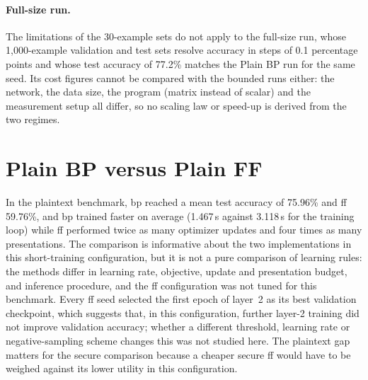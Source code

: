 \paragraph{Full-size run.} The limitations of the 30-example sets do not apply to the full-size run, whose 1{,}000-example validation and test sets resolve accuracy in steps of 0.1 percentage points and whose test accuracy of 77.2\% matches the Plain BP run for the same seed. Its cost figures cannot be compared with the bounded runs either: the network, the data size, the program (matrix instead of scalar) and the measurement setup all differ, so no scaling law or speed-up is derived from the two regimes.

\section{Plain BP versus Plain FF}\label{sec:disc-plain}
In the plaintext benchmark, \ac{bp} reached a mean test accuracy of 75.96\% and \ac{ff} 59.76\%, and \ac{bp} trained faster on average (1.467\,s against 3.118\,s for the training loop) while \ac{ff} performed twice as many optimizer updates and four times as many presentations. The comparison is informative about the two implementations in this short-training configuration, but it is not a pure comparison of learning rules: the methods differ in learning rate, objective, update and presentation budget, and inference procedure, and the \ac{ff} configuration was not tuned for this benchmark. Every \ac{ff} seed selected the first epoch of layer~2 as its best validation checkpoint, which suggests that, in this configuration, further layer-2 training did not improve validation accuracy; whether a different threshold, learning rate or negative-sampling scheme changes this was not studied here. The plaintext gap matters for the secure comparison because a cheaper secure \ac{ff} would have to be weighed against its lower utility in this configuration.

